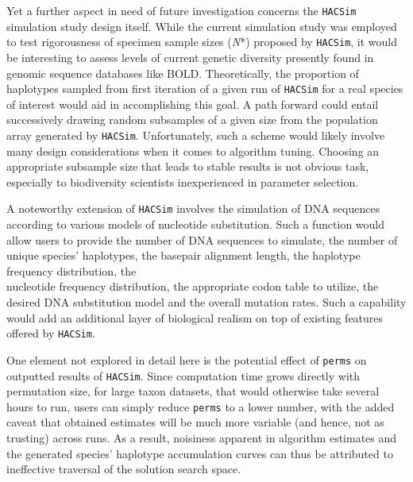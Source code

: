 Yet a further aspect in need of future investigation concerns the {\tt HACSim} simulation study design itself. While the current simulation study was employed to test rigorousness of specimen sample sizes (\textit{N}*) proposed by {\tt HACSim}, it would be interesting to assess levels of current genetic diversity presently found in genomic sequence databases like BOLD. Theoretically, the proportion of haplotypes sampled from first iteration of a given run of {\tt HACSim} for a real species of interest would aid in accomplishing this goal. A path forward could entail successively drawing random subsamples of a given size from the population array generated by {\tt HACSim}. Unfortunately, such a scheme would likely involve many design considerations when it comes to algorithm tuning. Choosing an appropriate subsample size that leads to stable results is not obvious task, especially to biodiversity scientists inexperienced in parameter selection.   



A noteworthy extension of {\tt HACSim} involves the simulation of DNA sequences \\ according to various models of nucleotide substitution. Such a function would allow users to provide the number of DNA sequences to simulate, the number of unique species' haplotypes, the basepair alignment length, the haplotype frequency distribution, the \\ nucleotide frequency distribution, the appropriate codon table to utilize, the desired DNA substitution model and the overall mutation rates. Such a capability would add an additional layer of biological realism on top of existing features offered by {\tt HACSim}.


One element not explored in detail here is the potential effect of {\tt perms} on outputted results of {\tt HACSim}. Since computation time grows directly with permutation size, for large taxon datasets, that would otherwise take several hours to run, users can simply reduce {\tt perms} to a lower number, with the added caveat that obtained estimates will be much more variable (and hence, not as trusting) across runs. As a result, noisiness apparent in algorithm estimates and the generated species' haplotype accumulation curves can thus be attributed to ineffective traversal of the solution search space.


